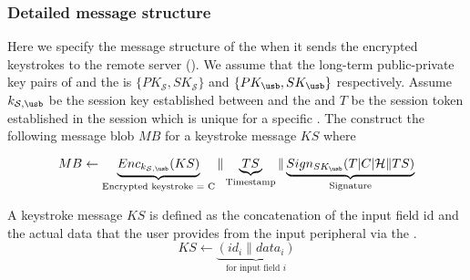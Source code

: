 \subsubsection{Detailed message structure}

Here we specify the message structure of the \device when it sends the encrypted keystrokes to the remote server (\server). We assume that the long-term public-private key pairs of \server and the \device is $\{PK_\mathcal{S}, SK_\mathcal{S}\}$ and $\{PK_\usb, SK_\usb\}$ respectively. Assume $k_{\mathcal{S}, \usb}$ be the session key established between \server and the \device and $T$ be the session token established in the \tls session which is unique for a specific \device. The \device construct the following message blob $MB$ for a keystroke message $KS$ where

\[
  MB \leftarrow 
    \underbrace{Enc_{k_{\mathcal{S}, \usb}} (KS)}_{\text{Encrypted keystroke = C}} \| 
    \underbrace{TS}_\text{Timestamp} \|
    \underbrace{Sign_{SK_\usb}(T| C| \mathcal{H} \| TS)}_\text{Signature}
\]

A keystroke message $KS$ is defined as the concatenation of the input field id and the actual data that the user provides from the input peripheral via the \device.
\[
    KS \leftarrow  \underbrace{(id_i\|data_i)}_{\text{for input field $i$}}
\]
\fi


